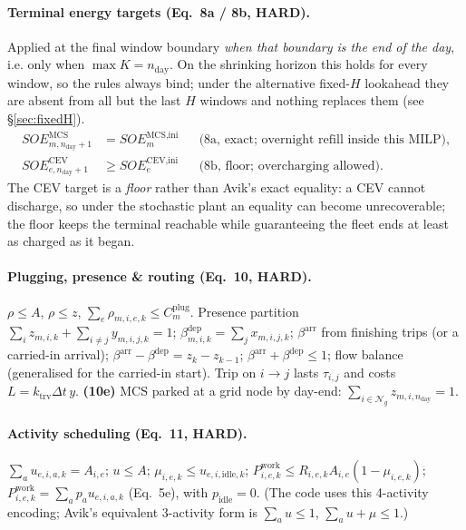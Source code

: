 \documentclass[11pt]{article}
\newcommand{\dt}{\Delta t}
\begin{document}
\paragraph{Terminal energy targets (Eq.\ 8a / 8b, HARD).}
Applied at the final window boundary \emph{when that boundary is the end of the day}, i.e.
only when $\max K=n_{\text{day}}$. On the shrinking horizon this holds for every window, so
the rules always bind; under the alternative fixed-$H$ lookahead they are absent from all
but the last $H$ windows and nothing replaces them (see \S\ref{sec:fixedH}).
\begin{align}
SOE^{\text{MCS}}_{m,n_{\text{day}}+1}&= SOE^{\text{MCS,ini}}_m && \text{(8a, exact; overnight refill inside this MILP)},\\
SOE^{\text{CEV}}_{e,n_{\text{day}}+1}&\ge SOE^{\text{CEV,ini}}_e && \text{(8b, floor; overcharging allowed)}.
\end{align}
The CEV target is a \emph{floor} rather than Avik's exact equality: a CEV cannot discharge, so
under the stochastic plant an equality can become unrecoverable; the floor keeps the terminal
reachable while guaranteeing the fleet ends at least as charged as it began.

\paragraph{Plugging, presence \& routing (Eq.\ 10, HARD).}
$\rho\le A$, $\rho\le z$, $\sum_e \rho_{m,i,e,k}\le C^{\text{plug}}_m$. Presence partition
$\sum_i z_{m,i,k}+\sum_{i\ne j}y_{m,i,j,k}=1$; $\beta^{\text{dep}}_{m,i,k}=\sum_j x_{m,i,j,k}$;
$\beta^{\text{arr}}$ from finishing trips (or a carried-in arrival);
$\beta^{\text{arr}}-\beta^{\text{dep}}=z_k-z_{k-1}$; $\beta^{\text{arr}}+\beta^{\text{dep}}\le1$;
flow balance (generalised for the carried-in start). Trip on $i\!\to\!j$ lasts $\tau_{i,j}$ and
costs $L=k_{\text{trv}}\dt\,y$. \textbf{(10e)} MCS parked at a grid node by day-end:
$\sum_{i\in\mathcal{N}_g}z_{m,i,n_{\text{day}}}=1$.

\paragraph{Activity scheduling (Eq.\ 11, HARD).}
$\sum_a u_{e,i,a,k}=A_{i,e}$; $u\le A$; $\mu_{i,e,k}\le u_{e,i,\text{idle},k}$;
$P^{\text{work}}_{i,e,k}\le R_{i,e,k}A_{i,e}(1-\mu_{i,e,k})$;
$P^{\text{work}}_{i,e,k}=\sum_a p_a u_{e,i,a,k}$ (Eq.\ 5e), with $p_{\text{idle}}=0$.
(The code uses this 4-activity encoding; Avik's equivalent 3-activity form is
$\sum_a u\le1$, $\sum_a u+\mu\le1$.)
\end{document}
